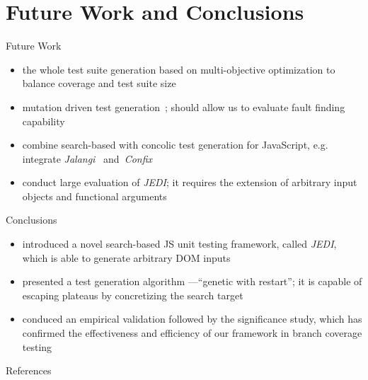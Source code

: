 \documentclass{beamer}
\begin{document}
\section{Future Work and Conclusions}

\begin{frame}{Future Work}
\begin{itemize}
  \item the whole test suite generation based on multi-objective optimization to balance coverage and test suite size~\cite{panichella2017lips}
    \item mutation driven test generation~\cite{fraser2012mutation}; should allow us to evaluate fault finding capability
    \item combine search-based with concolic test generation for JavaScript, e.g. integrate \emph{Jalangi}~\cite{sen2013jalangi} and~\emph{Confix}~\cite{amin:ase15}
      \item conduct large evaluation of \emph{JEDI}; it requires the extension of arbitrary input objects and functional arguments~\cite{claessen2011quickcheck, selakovic2018test}
\end{itemize}
\end{frame}

\begin{frame}{Conclusions}
  \begin{itemize}
    \item introduced a novel search-based JS unit testing framework, called \emph{JEDI}, which is able to generate arbitrary DOM inputs
     \item presented a test generation algorithm ---``genetic with restart''; it is capable of escaping plateaus by concretizing the search target
     \item conduced an empirical validation followed by the significance study, which has confirmed the effectiveness and efficiency of our framework in branch coverage testing 
 
  \end{itemize}
\end{frame}


\begin{frame}[t,allowframebreaks]{References}
\tiny


\end{frame}
\end{document}

